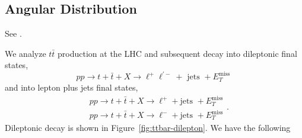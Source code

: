 \subsection{Angular Distribution}
See \autocite[Sect.~4.2]{bernreutherSetTop2015}. 

We analyze $t \bar{t}$ production at the LHC and subsequent decay into dileptonic final states,
\[
p p \rightarrow t+\bar{t}+X \rightarrow \ell^{+} \ell^{\prime-}+\text { jets }+E_T^{\text {miss }}
\]
and into lepton plus jets final states,
\[
\begin{aligned}
& p p \rightarrow t+\bar{t}+X \rightarrow \ell^{+}+\text {jets }+E_T^{\mathrm{miss}} \\
& p p \rightarrow t+\bar{t}+X \rightarrow \ell^{-}+\text {jets }+E_T^{\mathrm{miss}}
\end{aligned}.
\]
Dileptonic decay is shown in Figure~\ref{fig:ttbar-dilepton}. We have the following 
